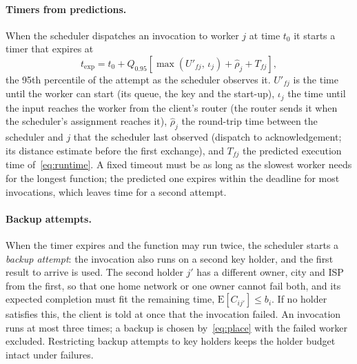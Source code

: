 \paragraph{Timers from predictions.}
When the scheduler dispatches an invocation to worker $j$ at time $t_0$ it starts a timer that expires at
\begin{equation}
t_{\mathrm{exp}} = t_0 + Q_{0.95}\!\left[\max\!\left(U'_{fj},\, \iota_{j}\right) + \hat\rho_{j} + T_{fj}\right],
\label{eq:timer}
\end{equation}
the 95th percentile of the attempt as the scheduler observes it. $U'_{fj}$ is the time until the worker can start
(its queue, the key and the start-up), $\iota_j$ the time until the input reaches the worker from the client's router
(the router sends it when the scheduler's assignment reaches it), $\hat\rho_j$ the round-trip time between the scheduler and
$j$ that the scheduler last observed (dispatch to acknowledgement; its distance estimate before the first exchange),
and $T_{fj}$ the predicted execution time of~\eqref{eq:runtime}. A fixed timeout must be as long as the slowest worker
needs for the longest function; the predicted one expires within the deadline for most invocations, which leaves
time for a second attempt.

\paragraph{Backup attempts.}
When the timer expires and the function may run twice, the scheduler starts a \emph{backup attempt}: the invocation
also runs on a second key holder, and the first result to arrive is used. The second holder $j'$ has a different
owner, city and ISP from the first, so that one home network or one owner cannot fail both, and its expected
completion must fit the remaining time, $\mathrm{E}[C_{ij'}] \le b_i$. If no holder satisfies this,
the client is told at once that the invocation failed. An invocation runs at most three times; a backup is chosen
by~\eqref{eq:place} with the failed worker excluded.
Restricting backup attempts to key holders keeps the holder budget intact under failures.

